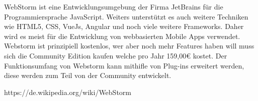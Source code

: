 WebStorm ist eine Entwicklungsumgebung der Firma JetBrains für die Programmiersprache JavaScript. Weiters unterstützt es auch weitere Techniken wie HTML5, CSS, VueJs, Angular und noch viele weitere Frameworks. Daher wird es meist für die Entwicklung von webbasierten Mobile Apps verwendet.
Webstorm ist prinzipiell kostenlos, wer aber noch mehr Features haben will muss sich die Community Edition kaufen welche pro Jahr 159,00€ kostet.
Der Funktionsumfang von Webstorm kann mithifle von Plug-ins erweitert werden, diese werden zum Teil von der Community entwickelt.



https://de.wikipedia.org/wiki/WebStorm